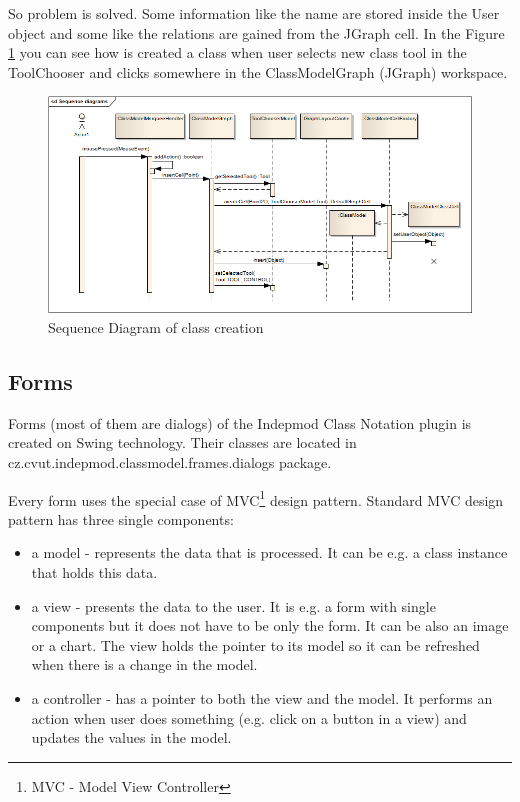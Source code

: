 So problem is solved. Some information like the name are stored inside the User object and some like the relations are gained from the JGraph cell. In the Figure \ref{f-ClassCreationSequenceDiagram} you can see how is created a class when user selects new class tool in the ToolChooser and clicks somewhere in the ClassModelGraph (JGraph) workspace.

\begin{figure}[!ht]
\begin{center}
\includegraphics[width=\textwidth]{img/ClassCreationSequenceDiagram.png}
\caption{Sequence Diagram of class creation}
\label{f-ClassCreationSequenceDiagram}
\end{center}
\end{figure}

\subsection{Forms}

Forms (most of them are dialogs) of the Indepmod Class Notation plugin is created on Swing technology. Their classes are located in cz.cvut.indepmod.classmodel.frames.dialogs package.

Every form uses the special case of MVC\footnote{MVC - Model View Controller} design pattern. Standard MVC design pattern has three single components:
 \begin{itemize}
    \item a model - represents the data that is processed. It can be e.g. a class instance that holds this data.
    \item a view - presents the data to the user. It is e.g. a form with single components but it does not have to be only the form. It can be also an image or a chart. The view holds the pointer to its model so it can be refreshed when there is a change in the model.
    \item a controller - has a pointer to both the view and the model. It performs an action when user does something (e.g. click on a button in a view) and updates the values in the model.
\end{itemize}

